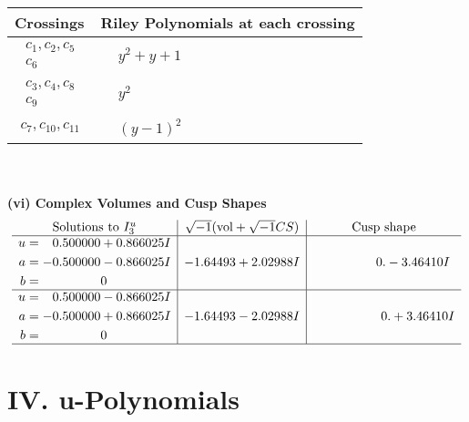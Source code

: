 \documentclass[1p]{elsarticle_modified}
\theoremstyle{definition}
\newcommand{\I}{\sqrt{-1}}
\begin{document}
\begin{tabular}{m{50pt}|m{274pt}}
Crossings & \hspace{64pt}Riley Polynomials at each crossing \\
\hline $$\begin{aligned}c_{1},c_{2},c_{5}\\c_{6}\end{aligned}$$&$\begin{aligned}
&y^2+y+1
\end{aligned}$\\
\hline $$\begin{aligned}c_{3},c_{4},c_{8}\\c_{9}\end{aligned}$$&$\begin{aligned}
&y^2
\end{aligned}$\\
\hline $$\begin{aligned}c_{7},c_{10},c_{11}\end{aligned}$$&$\begin{aligned}
&(y-1)^2
\end{aligned}$\\
\hline
\end{tabular}\\~\\
\newpage\flushleft \textbf{(vi) Complex Volumes and Cusp Shapes}
$$\begin{array}{c|c|c}  
\text{Solutions to }I^u_{3}& \I (\text{vol} + \sqrt{-1}CS) & \text{Cusp shape}\\
 \hline 
\begin{aligned}
u &= \phantom{-}0.500000 + 0.866025 I \\
a &= -0.500000 - 0.866025 I \\
b &= \phantom{-0.000000 } 0\end{aligned}
 & -1.64493 + 2.02988 I & \phantom{-0.000000 } 0. - 3.46410 I \\ \hline\begin{aligned}
u &= \phantom{-}0.500000 - 0.866025 I \\
a &= -0.500000 + 0.866025 I \\
b &= \phantom{-0.000000 } 0\end{aligned}
 & -1.64493 - 2.02988 I & \phantom{-0.000000 -}0. + 3.46410 I\\
 \hline 
 \end{array}$$\newpage
\newpage\renewcommand{\arraystretch}{1}
\centering \section*{ IV. u-Polynomials}
\end{document}
